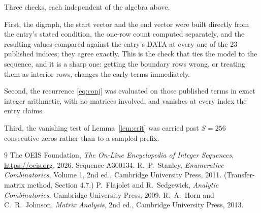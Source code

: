 \documentclass[11pt,a4paper]{article}
\theoremstyle{plain}
\theoremstyle{definition}
\begin{document}
Three checks, each independent of the algebra above.

First, the digraph, the start vector and the end vector were built directly from the
entry's stated condition, the one-row count computed separately, and the resulting values
compared against the entry's DATA at every one of the $23$ published indices; they
agree exactly. This is the check that ties the model to the sequence, and it is a sharp one:
getting the boundary rows wrong, or treating them as interior rows, changes the early terms
immediately.

Second, the recurrence \eqref{eq:conj} was evaluated on those published terms in exact
integer arithmetic, with no matrices involved, and vanishes at every index the entry claims.

Third, the vanishing test of Lemma~\ref{lem:crit} was carried past $S=256$ consecutive
zeros rather than to a sampled prefix.

\begin{thebibliography}{9}
 The OEIS Foundation, \emph{The On-Line Encyclopedia of Integer
Sequences}, \url{https://oeis.org}, 2026. Sequence A300134.
 R.~P.~Stanley, \emph{Enumerative Combinatorics}, Volume 1, 2nd ed.,
Cambridge University Press, 2011. (Transfer-matrix method, Section 4.7.)
 P.~Flajolet and R.~Sedgewick, \emph{Analytic Combinatorics}, Cambridge
University Press, 2009.
 R.~A.~Horn and C.~R.~Johnson, \emph{Matrix Analysis}, 2nd ed., Cambridge
University Press, 2013.
\end{thebibliography}
\end{document}
